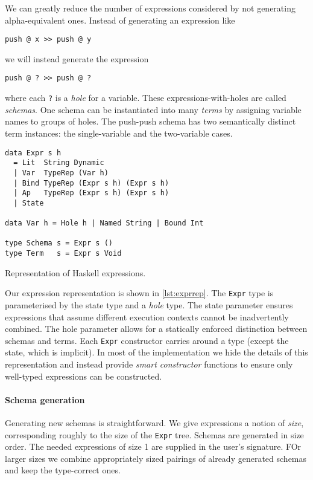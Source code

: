 We can greatly reduce the number of expressions considered by not
generating alpha-equivalent ones.  Instead of generating an expression
like

\begin{verbatim}
push @ x >> push @ y
\end{verbatim}

\noindent
we will instead generate the expression

\begin{verbatim}
push @ ? >> push @ ?
\end{verbatim}

\noindent
where each \verb|?| is a \emph{hole} for a variable.  These
expressions-with-holes are called \emph{schemas}.  One schema can be
instantiated into many \emph{terms} by assigning variable names to
groups of holes.  The push-push schema has two semantically distinct
term instances: the single-variable and the two-variable cases.

\begin{listing}
\begin{verbatim}
data Expr s h
  = Lit  String Dynamic
  | Var  TypeRep (Var h)
  | Bind TypeRep (Expr s h) (Expr s h)
  | Ap   TypeRep (Expr s h) (Expr s h)
  | State

data Var h = Hole h | Named String | Bound Int

type Schema s = Expr s ()
type Term   s = Expr s Void
\end{verbatim}
\caption{Representation of Haskell expressions.}
\label{lst:exprrep}
\end{listing}

Our expression representation is shown in \cref{lst:exprrep}.  The
\verb|Expr| type is parameterised by the state type and a \emph{hole}
type.  The state parameter ensures expressions that assume different
execution contexts cannot be inadvertently combined.  The hole
parameter allows for a statically enforced distinction between schemas
and terms.  Each \verb|Expr| constructor carries around a type (except
the state, which is implicit).  In most of the implementation we hide
the details of this representation and instead provide \emph{smart
  constructor} functions to ensure only well-typed expressions can be
constructed.

\paragraph{Schema generation}
Generating new schemas is straightforward.  We give expressions a
notion of \emph{size}, corresponding roughly to the size of the
\verb|Expr| tree.  Schemas are generated in size order.  The needed
expressions of size 1 are supplied in the user's signature.  FOr
larger sizes we combine appropriately sized pairings of already
generated schemas and keep the type-correct ones.

